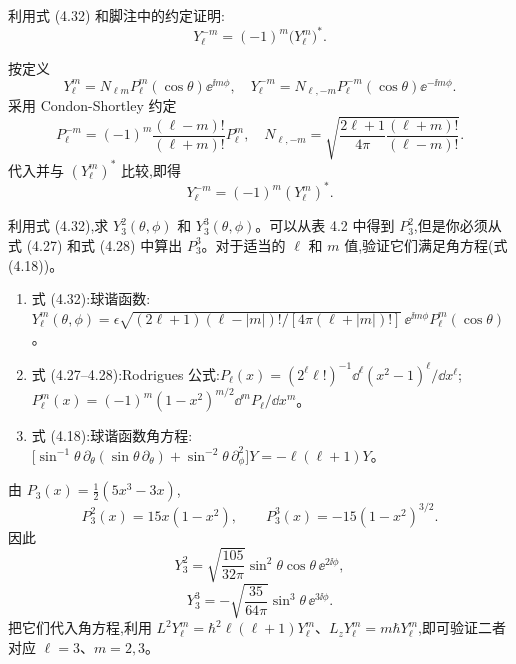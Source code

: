 \begin{question}
利用式 (4.32) 和脚注中的约定证明:
\[
Y_\ell^{-m}=(-1)^m\bigl(Y_\ell^m\bigr)^* .
\]

\par\smallskip
{}

\end{question}
\begin{solution}

按定义
\[
Y_\ell^m=N_{\ell m}P_\ell^m(\cos\theta)\ee^{\ii m\phi},
\quad
Y_\ell^{-m}=N_{\ell,-m}P_\ell^{-m}(\cos\theta)\ee^{-\ii m\phi}.
\]
采用 Condon-Shortley 约定
\[
P_\ell^{-m}=(-1)^m\frac{(\ell-m)!}{(\ell+m)!}P_\ell^m,
\quad
N_{\ell,-m}=\sqrt{\frac{2\ell+1}{4\pi}\frac{(\ell+m)!}{(\ell-m)!}}.
\]
代入并与 $(Y_\ell^m)^*$ 比较,即得
\[
Y_\ell^{-m}=(-1)^m(Y_\ell^m)^*.
\]

\end{solution}

\begin{question}
利用式 (4.32),求 $Y_3^2(\theta,\phi)$ 和 $Y_3^3(\theta,\phi)$。可以从表 4.2 中得到 $P_3^2$,但是你必须从式 (4.27) 和式 (4.28) 中算出 $P_3^3$。对于适当的 $\ell$ 和 $m$ 值,验证它们满足角方程(式 (4.18))。

\par\smallskip
{}
\begin{enumerate}[leftmargin=2.2em,itemsep=0.12em,topsep=0.12em,parsep=0pt]
\item 式 (4.32):球谐函数:$Y_\ell^m(\theta,\phi)=\epsilon\sqrt{(2\ell+1)(\ell-|m|)!/[4\pi(\ell+|m|)!]}\,\ee^{\ii m\phi}P_\ell^m(\cos\theta)$。
\item 式 (4.27--4.28):Rodrigues 公式:$P_\ell(x)=(2^\ell\ell!)^{-1}\dd^\ell(x^2-1)^\ell/\dd x^\ell$;$P_\ell^m(x)=(-1)^m(1-x^2)^{m/2}\dd^mP_\ell/\dd x^m$。
\item 式 (4.18):球谐函数角方程:$\bigl[\sin^{-1}\theta\,\partial_\theta(\sin\theta\,\partial_\theta)+\sin^{-2}\theta\,\partial_\phi^2\bigr]Y=-\ell(\ell+1)Y$。
\end{enumerate}

\end{question}
\begin{solution}

由 $P_3(x)=\tfrac12(5x^3-3x)$,
\[
P_3^2(x)=15x(1-x^2),\qquad P_3^3(x)=-15(1-x^2)^{3/2}.
\]
因此
\[
Y_3^2=\sqrt{\frac{105}{32\pi}}\sin^2\theta\cos\theta\,\ee^{2\ii\phi},
\]
\[
Y_3^3=-\sqrt{\frac{35}{64\pi}}\sin^3\theta\,\ee^{3\ii\phi}.
\]
把它们代入角方程,利用 $L^2Y_\ell^m=\hbar^2\ell(\ell+1)Y_\ell^m$、$L_zY_\ell^m=m\hbar Y_\ell^m$,即可验证二者对应 $\ell=3$、$m=2,3$。

\end{solution}

